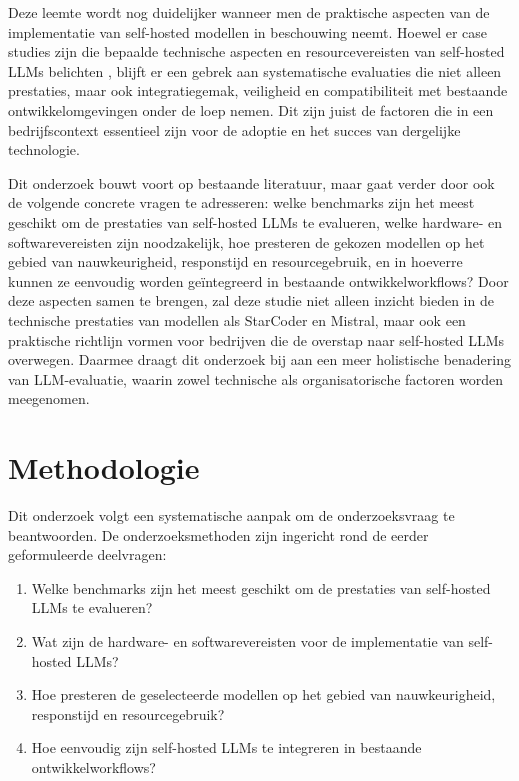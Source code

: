 Deze leemte wordt nog duidelijker wanneer men de praktische aspecten van de implementatie van self-hosted modellen in beschouwing neemt. Hoewel er case studies zijn die bepaalde technische aspecten en resourcevereisten van self-hosted LLMs belichten \autocite{Rao2023}, blijft er een gebrek aan systematische evaluaties die niet alleen prestaties, maar ook integratiegemak, veiligheid en compatibiliteit met bestaande ontwikkelomgevingen onder de loep nemen. Dit zijn juist de factoren die in een bedrijfscontext essentieel zijn voor de adoptie en het succes van dergelijke technologie.

Dit onderzoek bouwt voort op bestaande literatuur, maar gaat verder door ook de volgende concrete vragen te adresseren: welke benchmarks zijn het meest geschikt om de prestaties van self-hosted LLMs te evalueren, welke hardware- en softwarevereisten zijn noodzakelijk, hoe presteren de gekozen modellen op het gebied van nauwkeurigheid, responstijd en resourcegebruik, en in hoeverre kunnen ze eenvoudig worden geïntegreerd in bestaande ontwikkelworkflows? Door deze aspecten samen te brengen, zal deze studie niet alleen inzicht bieden in de technische prestaties van modellen als StarCoder en Mistral, maar ook een praktische richtlijn vormen voor bedrijven die de overstap naar self-hosted LLMs overwegen. Daarmee draagt dit onderzoek bij aan een meer holistische benadering van LLM-evaluatie, waarin zowel technische als organisatorische factoren worden meegenomen.
\section{Methodologie}%
\label{sec:methodologie}

Dit onderzoek volgt een systematische aanpak om de onderzoeksvraag te beantwoorden. De onderzoeksmethoden zijn ingericht rond de eerder geformuleerde deelvragen:

\begin{enumerate}
    \item Welke benchmarks zijn het meest geschikt om de prestaties van self-hosted LLMs te evalueren?

    \item Wat zijn de hardware- en softwarevereisten voor de implementatie van self-hosted LLMs?

    \item Hoe presteren de geselecteerde modellen op het gebied van nauwkeurigheid, responstijd en resourcegebruik?

    \item Hoe eenvoudig zijn self-hosted LLMs te integreren in bestaande ontwikkelworkflows?

\end{enumerate}


